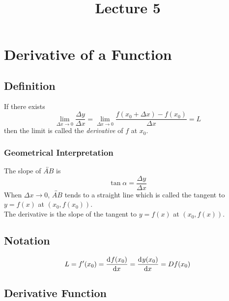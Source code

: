 \documentclass[fleqn]{article}
\title{Lecture 5}
\author{}
\date{\formatdate{11}{11}{2014}}
\begin{document}
	
\maketitle

\tableofcontents

\newpage
\section{Derivative of a Function}

\subsection{Definition}


If there exists
\begin{equation*}
	\lim\limits_{\Delta x \rightarrow 0} \dfrac{\Delta y}{\Delta x} = \lim\limits_{\Delta x \rightarrow 0} \dfrac{f(x_0 + \Delta x) - f(x_0)}{\Delta x} = L
\end{equation*}
then the limit is called the \emph{derivative} of $f$ at $x_0$.

\subsubsection{Geometrical Interpretation}
The slope of $\overleftrightarrow{AB}$ is 
\begin{equation*}
\tan \alpha = \dfrac{\Delta y}{\Delta x}
\end{equation*}
When $\Delta x \rightarrow 0$, $\overleftrightarrow{AB}$ tends to a straight line which is called the tangent to $y = f(x)$ at $(x_0, f(x_0))$.\\
The derivative is the slope of the tangent to $y = f(x)$ at $(x_0, f(x))$.

\subsection{Notation}

\begin{equation*}
	L = f'(x_0) = \dod{f(x_0)}{x} = \dod{y(x_0)}{x} = D f(x_0)	 
\end{equation*}

\subsection{Derivative Function}
\end{document}
